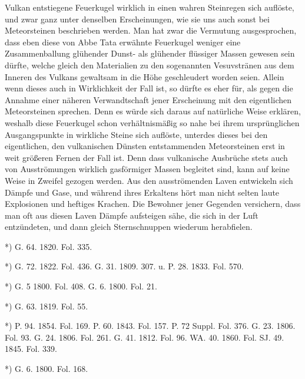 \documentclass[a4paper, 8pt, oneside, polutonikogreek, german]{article}
\begin{document}
Vulkan entstiegene Feuerkugel wirklich in einen wahren Steinregen sich auflöste, und zwar ganz unter denselben Erscheinungen, wie sie uns auch sonst bei Meteorsteinen beschrieben werden. Man hat zwar die Vermutung ausgesprochen, dass eben diese von Abbe Tata erwähnte Feuerkugel weniger eine Zusammenballung glühender Dunst- als glühender flüssiger Massen gewesen sein dürfte, welche gleich den Materialien zu den sogenannten Vesuvstränen aus dem Inneren des Vulkans gewaltsam in die Höhe geschleudert worden seien. Allein wenn dieses auch in Wirklichkeit der Fall ist, so dürfte es eher für, als gegen die Annahme einer näheren Verwandtschaft jener Erscheinung mit den eigentlichen Meteorsteinen sprechen. Denn es würde sich daraus auf natürliche Weise erklären, weshalb diese Feuerkugel schon verhältnismäßig so nahe bei ihrem ursprünglichen Ausgangspunkte in wirkliche Steine sich auflöste, unterdes dieses bei den eigentlichen, den vulkanischen Dünsten entstammenden Meteorsteinen erst in weit größeren Fernen der Fall ist. Denn dass vulkanische Ausbrüche stets auch von Ausströmungen wirklich gasförmiger Massen begleitet sind, kann auf keine Weise in Zweifel gezogen werden. Aus den ausströmenden Laven entwickeln sich Dämpfe und Gase, und während ihres Erkaltens hört man nicht selten laute Explosionen und heftiges Krachen. Die Bewohner jener Gegenden versichern, dass man oft aus diesen Laven Dämpfe aufsteigen sähe, die sich in der Luft entzündeten, und dann gleich Sternschnuppen wiederum herabfielen.

*) G. 64. 1820. Fol. 335.

*) G. 72. 1822. Fol. 436. G. 31. 1809. 307. u. P. 28. 1833. Fol. 570.

*) G. 5 1800. Fol. 408. G. 6. 1800. Fol. 21.

*) G. 63. 1819. Fol. 55.

*) P. 94. 1854. Fol. 169. P. 60. 1843. Fol. 157. P. 72 Suppl. Fol. 376. G. 23. 1806. Fol. 93. G. 24. 1806. Fol. 261. G. 41. 1812. Fol. 96. WA. 40. 1860. Fol. SJ. 49. 1845. Fol. 339.

*) G. 6. 1800. Fol. 168.
\end{document}
